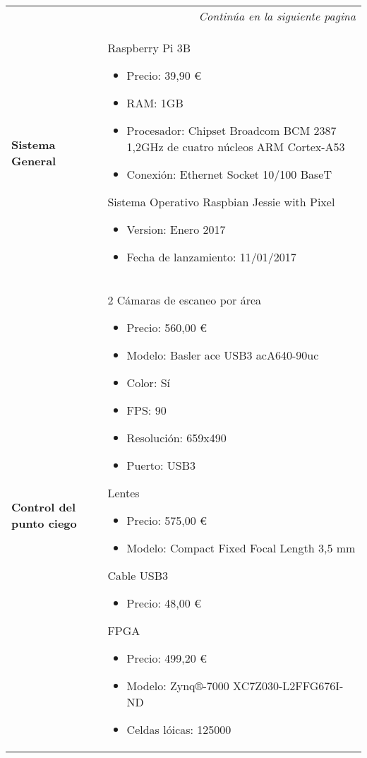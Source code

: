 \begin{center}
\begin{longtable}{p{5cm} p{8cm}}

\hline
\endfirsthead
\hline
\endhead

\hline \multicolumn{2}{r}{\textit{Continúa en la siguiente pagina}} \\
\endfoot
\endlastfoot

\textbf{Sistema General} &
Raspberry Pi 3B
\begin{itemize}
    \item Precio: 39,90 \euro
    \item RAM: 1GB
    \item Procesador: Chipset Broadcom BCM 2387 1,2GHz de cuatro núcleos ARM Cortex-A53
    \item Conexión: Ethernet Socket 10/100 BaseT
\end{itemize}
Sistema Operativo Raspbian Jessie with Pixel
\begin{itemize}
    \item Version: Enero 2017
    \item Fecha de lanzamiento: 11/01/2017
\end{itemize}
\\ \hline

\textbf{Control del punto ciego} &
2 Cámaras de escaneo por área
\begin{itemize}
    \item Precio: 560,00 \euro
    \item Modelo: Basler ace USB3 acA640-90uc
    \item Color: Sí
    \item FPS: 90
    \item Resolución: 659x490
    \item Puerto: USB3
\end{itemize}
Lentes
\begin{itemize}
    \item Precio: 575,00 \euro
    \item Modelo: Compact Fixed Focal Length 3,5 mm
\end{itemize}
Cable USB3
\begin{itemize}
    \item Precio: 48,00 \euro
\end{itemize}
FPGA
\begin{itemize}
    \item Precio: 499,20 \euro
    \item Modelo: Zynq®-7000 XC7Z030-L2FFG676I-ND
    \item Celdas lóicas: 125000
\end{itemize}



\end{longtable}
\end{center}
